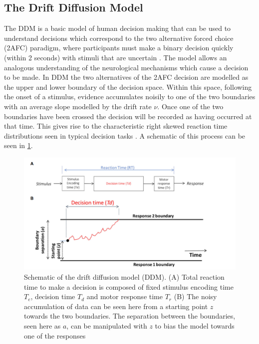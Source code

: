 \subsection{The Drift Diffusion Model}
The DDM is a basic model of human decision making that can be used to understand decisions which correspond to the two alternative forced choice (2AFC) paradigm, where participants must make a binary decision quickly (within 2 seconds) with stimuli that are uncertain \citep{ratcliffDiffusionDecisionModel2008, myersPracticalIntroductionUsing2022}. The model allows an analogous understanding of the neurological mechanisms which cause a decision to be made. In DDM the two alternatives of the 2AFC decision are modelled as the upper and lower boundary of the decision space. Within this space, following the onset of a stimulus, evidence accumulates noisily to one of the two boundaries with an average slope modelled by the drift rate $\nu$. Once one of the two boundaries have been crossed the decision will be recorded as having occurred at that time. This gives rise to the characteristic right skewed reaction time distributions seen in typical decision tasks \citep{ratcliffTheoryMemoryRetrieval1978}. A schematic of this process can be seen in \ref{fig:DDM plot}.
\begin{figure}[H]
    \centering
    \includegraphics[width=0.75\linewidth]{figures/DDM.PNG}
    \caption{Schematic of the drift diffusion model (DDM). (A) Total reaction time to make a decision is composed of fixed stimulus encoding time $T_{e}$, decision time $T_{d}$ and motor response time $T_{r}$ (B) The noisy accumulation of data can be seen here from a starting point $z$ towards the two boundaries. The separation between the boundaries, seen here as $a$, can be manipulated with $z$ to bias the model towards one of the responses \citep{myersPracticalIntroductionUsing2022}}
    \label{fig:DDM plot}
\end{figure}

